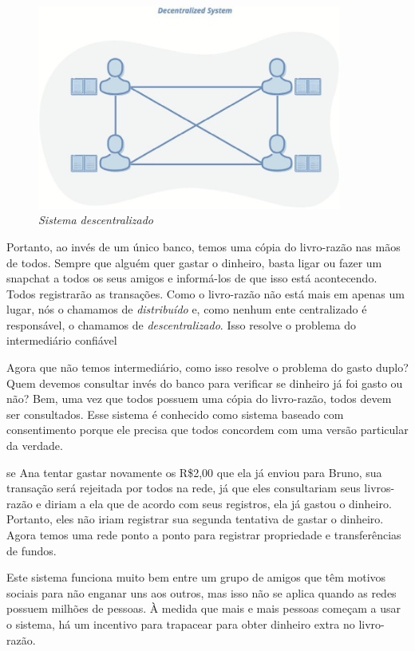~

\begin{figure}
  \centering
  \includegraphics[width=10cm]{imagens/descentralizado-capitulo-02.jpg}
  \caption*{\textit{\small Sistema descentralizado}}
\end{figure}

Portanto, ao invés de um único banco, temos uma cópia do livro-razão nas mãos de todos. Sempre que alguém quer gastar o dinheiro, basta ligar ou fazer um snapchat a todos os seus amigos e informá-los de que isso está acontecendo. Todos registrarão as transações. Como o livro-razão não está mais em apenas um lugar, nós o chamamos de \textit{distribuído} e, como nenhum ente centralizado é responsável, o chamamos de \textit{descentralizado}.
Isso resolve o problema do intermediário confiável

Agora que não temos intermediário, como isso resolve o problema do gasto duplo? Quem devemos consultar invés do banco para verificar se dinheiro já foi gasto ou não? Bem, uma vez que todos possuem uma cópia do livro-razão, todos devem ser consultados. Esse sistema é conhecido como sistema baseado com consentimento porque ele precisa que todos concordem com uma versão particular da verdade.%

se Ana tentar gastar novamente os R\$2,00 que ela já enviou para Bruno, sua transação será rejeitada por todos na rede, já que eles consultariam seus livros-razão e diriam a ela que de acordo com seus registros, ela já gastou o dinheiro.
Portanto, eles não iriam registrar sua segunda tentativa de gastar o dinheiro. Agora temos uma rede ponto a ponto para registrar propriedade e transferências de fundos.

Este sistema funciona muito bem entre um grupo de amigos que têm motivos sociais para não enganar uns aos outros, mas isso não se aplica quando as redes possuem milhões de pessoas. 
À medida que mais e mais pessoas começam a usar o sistema, há um incentivo para trapacear para obter dinheiro extra no livro-razão.

